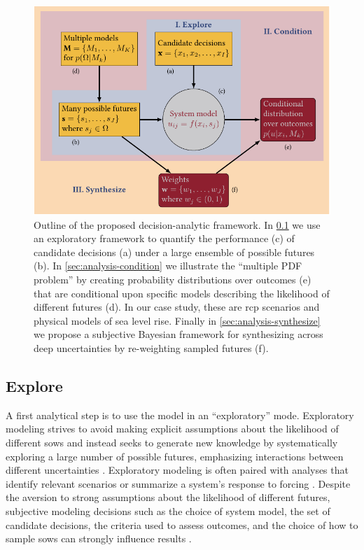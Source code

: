 \documentclass{agujournal2019}
\begin{document}
\begin{figure}
  \centering
  \includegraphics[width=\textwidth]{bayes-rdm.pdf}
  \caption{
    Outline of the proposed decision-analytic framework.
    In \cref{sec:analysis-explore} we use an exploratory framework to quantify the performance (c) of candidate decisions (a) under a large ensemble of possible futures (b).
    In \cref{sec:analysis-condition} we illustrate the ``multiple PDF problem'' by creating probability distributions over outcomes (e) that are conditional upon specific models describing the likelihood of different futures (d).
    In our case study, these are \gls{rcp} scenarios and physical models of sea level rise.
    Finally in \cref{sec:analysis-synthesize} we propose a subjective Bayesian framework for synthesizing across deep uncertainties by re-weighting sampled futures (f).
  }\label{fig:flowchart}
\end{figure}

\subsection{Explore}\label{sec:analysis-explore}

A first analytical step is to use the model in an ``exploratory'' mode.
Exploratory modeling strives to avoid making explicit assumptions about the likelihood of different \glspl{sow} and instead seeks to generate new knowledge \cite{bankes:1993} by systematically exploring a large number of possible futures, emphasizing interactions between different uncertainties \cite{reed_msdbook:2022}.
Exploratory modeling is often paired with analyses that identify relevant scenarios  \cite{lamontagne_discovery:2018,groves_scenarios:2007} or summarize a system's response to forcing \cite{Poff:2015jn,Steinschneider:2015kk,sriver_sealevel:2018}.
Despite the aversion to strong assumptions about the likelihood of different futures, subjective modeling decisions such as the choice of system model, the set of candidate decisions, the criteria used to assess outcomes, and the choice of how to sample \glspl{sow} can strongly influence results \cite{quinn_exploratory:2020}.
\end{document}
